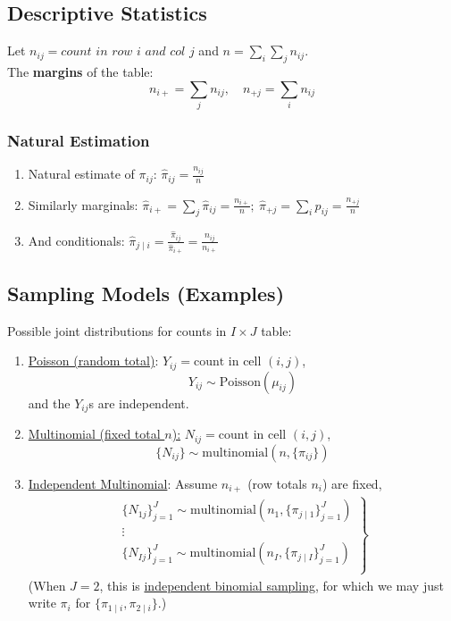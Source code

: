 \documentclass[11pt]{elegantbook}
\begin{document}
\subsection{Descriptive Statistics}
Let $n_{ij}=\textit{count in row $i$ and col $j$}$ and $n=\sum_i\sum_jn_{ij}$.\\
The \textbf{margins} of the table:
$$n_{i+}=\sum_jn_{ij},\quad n_{+j}=\sum_in_{ij}$$
\subsubsection*{Natural Estimation}
\begin{enumerate}
    \item Natural estimate of $\pi_{ij}$: $\hat{\pi}_{ij}=\frac{n_{ij}}{n}$
    \item Similarly marginals: $\hat{\pi}_{i+}=\sum_j \hat{\pi}_{ij}=\frac{n_{i+}}{n};\ \hat{\pi}_{+j}=\sum_i p_{ij}=\frac{n_{+j}}{n}$
    \item And conditionals: $\hat{\pi}_{j\mid i}=\frac{\hat{\pi}_{ij}}{\hat{\pi}_{i+}}=\frac{n_{ij}}{n_{i+}}$
\end{enumerate}

\subsection{Sampling Models (Examples)}
Possible joint distributions for counts in $I \times J$ table:
\begin{enumerate}
    \item \underline{Poisson (random total)}: $Y_{ij} =\text{count in cell } (i,j)$,
    $$Y_{ij}\sim \text{Poisson}(\mu_{ij})$$
    and the $Y_{ij}$s are independent.
    \item \underline{Multinomial (fixed total $n$):} $N_{ij} = \text{count in cell } (i,j)$, $$\{N_{ij}\}\sim \text{multinomial}(n,\{\pi_{ij}\})$$
    \item \underline{Independent Multinomial}: Assume $n_{i+}$ (row totals $n_i$) are fixed,
    \begin{equation}
        \begin{aligned}
            \left.\begin{matrix}
                \{N_{1j}\}_{j=1}^J\sim \text{multinomial}(n_1,\{\pi_{j\mid 1}\}_{j=1}^J)\\
                \vdots\\
                \{N_{Ij}\}_{j=1}^J\sim \text{multinomial}(n_I,\{\pi_{j\mid I}\}_{j=1}^J)\\
            \end{matrix}\right\}
        \end{aligned}
        \nonumber
    \end{equation}
    (When $J = 2$, this is \underline{independent binomial sampling}, for which we may just write $\pi_i$ for $\{\pi_{1\mid i},\pi_{2\mid i}\}$.)
\end{enumerate}
\end{document}
